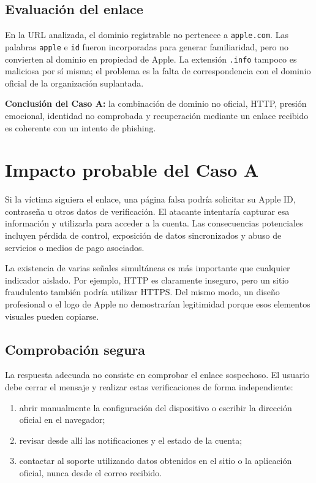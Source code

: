 \documentclass[11pt,a4paper]{article}
\newcommand{\infobox}[1]{%
  \noindent\colorbox{fondo}{\parbox{\dimexpr\textwidth-2\fboxsep}{#1}}}
\newcommand{\reportpage}{\clearpage\thispagestyle{fancy}}
\begin{document}
\subsection*{Evaluación del enlace}

En la URL analizada, el dominio registrable no pertenece a \texttt{apple.com}. Las palabras \texttt{apple} e \texttt{id} fueron incorporadas para generar familiaridad, pero no convierten al dominio en propiedad de Apple. La extensión \texttt{.info} tampoco es maliciosa por sí misma; el problema es la falta de correspondencia con el dominio oficial de la organización suplantada.

\infobox{\textcolor{alerta}{\textbf{Conclusión del Caso A:}} la combinación de dominio no oficial, HTTP, presión emocional, identidad no comprobada y recuperación mediante un enlace recibido es coherente con un intento de phishing.}

\reportpage
\section*{Impacto probable del Caso A}

Si la víctima siguiera el enlace, una página falsa podría solicitar su Apple ID, contraseña u otros datos de verificación. El atacante intentaría capturar esa información y utilizarla para acceder a la cuenta. Las consecuencias potenciales incluyen pérdida de control, exposición de datos sincronizados y abuso de servicios o medios de pago asociados.

La existencia de varias señales simultáneas es más importante que cualquier indicador aislado. Por ejemplo, HTTP es claramente inseguro, pero un sitio fraudulento también podría utilizar HTTPS. Del mismo modo, un diseño profesional o el logo de Apple no demostrarían legitimidad porque esos elementos visuales pueden copiarse.

\subsection*{Comprobación segura}

La respuesta adecuada no consiste en comprobar el enlace sospechoso. El usuario debe cerrar el mensaje y realizar estas verificaciones de forma independiente:

\begin{enumerate}
  \item abrir manualmente la configuración del dispositivo o escribir la dirección oficial en el navegador;
  \item revisar desde allí las notificaciones y el estado de la cuenta;
  \item contactar al soporte utilizando datos obtenidos en el sitio o la aplicación oficial, nunca desde el correo recibido.
\end{enumerate}
\end{document}
